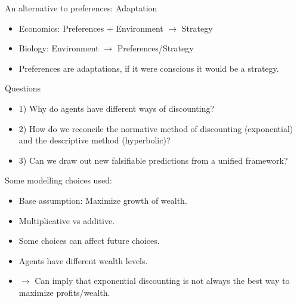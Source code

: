 \documentclass{beamer}
\numberwithin{equation}{section}
\begin{document}
\begin{frame}{An alternative to preferences: Adaptation}
\begin{itemize}
    \item Economics: Preferences + Environment $\rightarrow$ Strategy
    \item Biology: Environment $\rightarrow$ Preferences/Strategy 
    \item Preferences are adaptations, if it were conscious it would be a strategy. 
\end{itemize}
\end{frame}
\begin{frame}{Questions}
\begin{itemize}
    \item 1) Why do agents have different ways of discounting?
    \item 2) How do we reconcile the normative method of discounting (exponential) and the descriptive method (hyperbolic)?
    \item 3) Can we draw out new falsifiable predictions from a unified framework? 
\end{itemize}
\end{frame}
\begin{frame}{Some modelling choices used:}
\begin{itemize}
    \item Base assumption: Maximize growth of wealth.
    \item Multiplicative vs additive.
    \item Some choices can affect future choices.
    \item Agents have different wealth levels.
    \item $\rightarrow$ Can imply that exponential discounting is not always the best way to maximize profits/wealth.
\end{itemize}
\end{frame}
\end{document}
